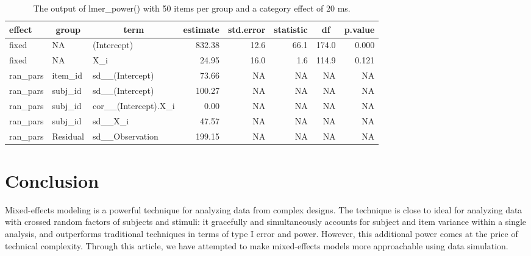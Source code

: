 \documentclass[
  english,
  doc,floatsintext]{apa6}
\begin{document}
\begin{table}[H]

\begin{center}
\begin{threeparttable}

\caption{\label{tab:lmer_power-new}The output of lmer\_power() with 50 items per group and a category effect of 20 ms.}

\small{

\begin{tabular}{lllrrrrr}
\toprule
effect & \multicolumn{1}{c}{group} & \multicolumn{1}{c}{term} & \multicolumn{1}{c}{estimate} & \multicolumn{1}{c}{std.error} & \multicolumn{1}{c}{statistic} & \multicolumn{1}{c}{df} & \multicolumn{1}{c}{p.value}\\
\midrule
fixed & NA & (Intercept) & 832.38 & 12.6 & 66.1 & 174.0 & 0.000\\
fixed & NA & X\_i & 24.95 & 16.0 & 1.6 & 114.9 & 0.121\\
ran\_pars & item\_id & sd\_\_(Intercept) & 73.66 & NA & NA & NA & NA\\
ran\_pars & subj\_id & sd\_\_(Intercept) & 100.27 & NA & NA & NA & NA\\
ran\_pars & subj\_id & cor\_\_(Intercept).X\_i & 0.00 & NA & NA & NA & NA\\
ran\_pars & subj\_id & sd\_\_X\_i & 47.57 & NA & NA & NA & NA\\
ran\_pars & Residual & sd\_\_Observation & 199.15 & NA & NA & NA & NA\\
\bottomrule
\end{tabular}

}

\end{threeparttable}
\end{center}

\end{table}

\hypertarget{conclusion}{%
\section{Conclusion}\label{conclusion}}

Mixed-effects modeling is a powerful technique for analyzing data from complex designs. The technique is close to ideal for analyzing data with crossed random factors of subjects and stimuli: it gracefully and simultaneously accounts for subject and item variance within a single analysis, and outperforms traditional techniques in terms of type I error and power. However, this additional power comes at the price of technical complexity. Through this article, we have attempted to make mixed-effects models more approachable using data simulation.
\end{document}
